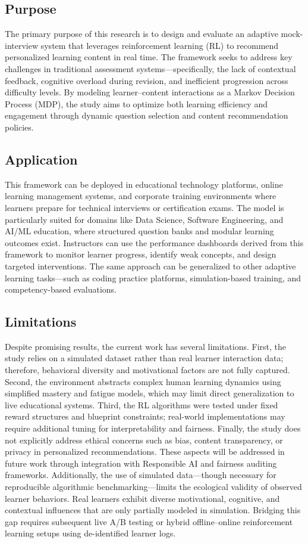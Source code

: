 \documentclass[preprint,12pt]{elsarticle}
\begin{document}
\begin{frontmatter}
\subsection{Purpose}
The primary purpose of this research is to design and evaluate an adaptive mock-interview system that leverages reinforcement learning (RL) to recommend personalized learning content in real time. The framework seeks to address key challenges in traditional assessment systems—specifically, the lack of contextual feedback, cognitive overload during revision, and inefficient progression across difficulty levels. By modeling learner–content interactions as a Markov Decision Process (MDP), the study aims to optimize both learning efficiency and engagement through dynamic question selection and content recommendation policies.

\subsection{Application}
This framework can be deployed in educational technology platforms, online learning management systems, and corporate training environments where learners prepare for technical interviews or certification exams. The model is particularly suited for domains like Data Science, Software Engineering, and AI/ML education, where structured question banks and modular learning outcomes exist. Instructors can use the performance dashboards derived from this framework to monitor learner progress, identify weak concepts, and design targeted interventions. The same approach can be generalized to other adaptive learning tasks—such as coding practice platforms, simulation-based training, and competency-based evaluations.

\subsection{Limitations}
Despite promising results, the current work has several limitations. First, the study relies on a simulated dataset rather than real learner interaction data; therefore, behavioral diversity and motivational factors are not fully captured. Second, the environment abstracts complex human learning dynamics using simplified mastery and fatigue models, which may limit direct generalization to live educational systems. Third, the RL algorithms were tested under fixed reward structures and blueprint constraints; real-world implementations may require additional tuning for interpretability and fairness. Finally, the study does not explicitly address ethical concerns such as bias, content transparency, or privacy in personalized recommendations. These aspects will be addressed in future work through integration with Responsible AI and fairness auditing frameworks.
Additionally, the use of simulated data—though necessary for reproducible algorithmic benchmarking—limits the ecological validity of observed learner behaviors. Real learners exhibit diverse motivational, cognitive, and contextual influences that are only partially modeled in simulation. Bridging this gap requires subsequent live A/B testing or hybrid offline–online reinforcement learning setups using de-identified learner logs.



\end{frontmatter}
\end{document}
